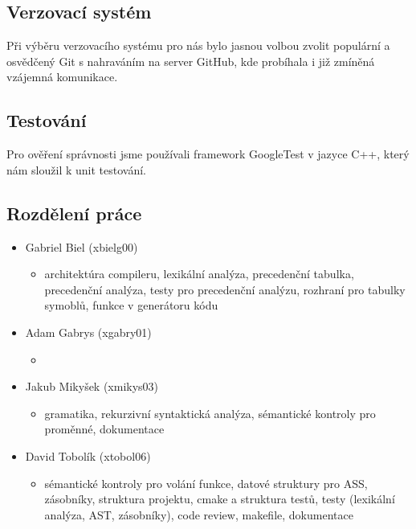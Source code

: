 \documentclass[a4paper, 12pt]{article}
\begin{document}
        \subsection{Verzovací systém}
            Při výběru verzovacího systému pro nás bylo jasnou volbou zvolit populární a osvědčený Git s nahraváním na server GitHub, kde probíhala i již zmíněná vzájemná komunikace.
        \subsection{Testování}
            Pro ověření správnosti jsme používali framework GoogleTest v jazyce C++, který nám sloužil k unit testování.
        \subsection{Rozdělení práce}
            \begin{itemize}
                \item Gabriel Biel (xbielg00)
                    \begin{itemize}
                        \item architektúra compileru, lexikální analýza, precedenční tabulka, precedenční analýza, testy pro precedenční analýzu, rozhraní pro tabulky symoblů, funkce v generátoru kódu
                    \end{itemize}
                \item Adam Gabrys (xgabry01)
                    \begin{itemize}
                        \item
                    \end{itemize}
                \item Jakub Mikyšek (xmikys03)
                    \begin{itemize}
                        \item gramatika, rekurzivní syntaktická analýza, sémantické kontroly pro proměnné, dokumentace
                    \end{itemize}
                \item David Tobolík (xtobol06)
                    \begin{itemize}
                        \item sémantické kontroly pro volání funkce, datové struktury pro ASS, zásobníky, struktura projektu, cmake a struktura testů, testy (lexikální analýza, AST, zásobníky), code review, makefile, dokumentace
                    \end{itemize}
            \end{itemize}
\end{document}
